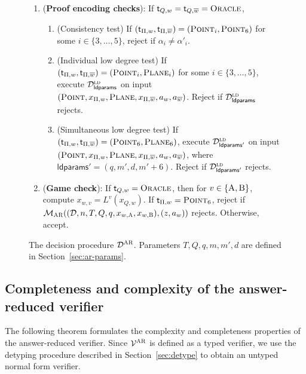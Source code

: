 \documentclass[11pt]{article}
\theoremstyle{definition}
\newcommand{\ol}[1]{\overline{#1}}
\newcommand{\ld}{\textsc{ld}}
\newcommand{\decider}{\mathcal{D}}
\newcommand{\verifier}{\mathcal{V}}
\newcommand{\gamestyle}[1]{\ensuremath{\textsc{#1}}\xspace}
\newcommand{\ar}{\gamestyle{AR}}
\newcommand{\labelstyle}[1]{\ensuremath{\textsc{#1}}\xspace}
\newcommand{\tvarstyle}[1]{\mathsf{#1}}
\newcommand{\tvar}{\ensuremath{\tvarstyle{t}}}
\newcommand{\alice}{\labelstyle{A}}
\newcommand{\bob}{\labelstyle{B}}
\newcommand{\oracle}{\labelstyle{Oracle}}
\newcommand{\typestyle}[1]{\ensuremath{\textsc{#1}}\xspace}
\newcommand{\Plane}{\typestyle{Plane}}
\newcommand{\Point}{\typestyle{Point}}
\newcommand{\ldparams}{\mathsf{ldparams}}
\newenvironment{gamespec}{
  \begin{mdframed}[style=figstyle]}{
  \end{mdframed}}
\newcommand{\pcpverifier}{\mathcal{M}_\ar}
\newcommand{\qlen}{Q}
\begin{document}
\begin{figure}[!htb]
\begin{gamespec}
\begin{enumerate}
    \item (\textbf{Proof encoding checks}): If $\tvar_{Q,w} = \tvar_{Q,\ol{w}} =
      \oracle$,
      \begin{enumerate}
			\item (Consistency test) If $(\tvar_{\Pi,w}, \tvar_{\Pi, \ol{w}}) =
        (\Point_i, \Point_6)$ for some $i \in \{3, \dots, 5\}$, reject if
        $\alpha_i \neq \alpha'_i$.
        \label{enu:ar-proof-cons-ld}

      \item (Individual low degree test) If $(\tvar_{\Pi,w}, \tvar_{\Pi,
          \ol{w}}) = (\Point_i, \Plane_i)$ for some $i \in \{3, \dots, 5\}$,
        execute $\decider^\ld_{\ldparams}$ on input $(\Point, x_{\Pi,w}
        ,\Plane,x_{\Pi,\overline{w}}, a_w,a_{\ol{w}})$.
        Reject if $\decider^\ld_{\ldparams}$ rejects.
        \label{enu:ar-proof-id-ld}

      \item (Simultaneous low degree test) If $(\tvar_{\Pi, w}, \tvar_{\Pi,
          \ol{w}}) = (\Point_6,\Plane_6)$, execute $\decider^\ld_{\ldparams'}$
        on input $(\Point, x_{\Pi,w} ,\Plane,x_{\Pi,\overline{w}},
        a_w,a_{\ol{w}})$, where $\ldparams'=(q,m',d,m'+6)$.
        Reject if $\decider^\ld_{\ldparams'}$ rejects.
        \label{enu:ar-proof-sim-ld}
      \end{enumerate}
      \label{enu:ar-proof-encoding}

    \item (\textbf{Game check}): If $\tvar_{Q,w} = \oracle$, then for $v \in
      \{\alice,\bob\}$, compute $x_{w,v} = L^{v}(x_{Q,w})$.
      If $\tvar_{\Pi,w} = \Point_6$, reject if $\pcpverifier((\decider, n , T,
      \qlen, q, x_{w,\alice}, x_{w,\bob}), (z, a_{w} ))$ rejects.
      Otherwise, accept. 
      \label{enu:ar-game}
    \end{enumerate}
  \end{gamespec}
  \caption{The decision procedure $\decider^\ar$.
    Parameters $T,Q,q,m,m',d$ are defined in
    Section~\ref{sec:ar-params}.}
  \label{fig:decider-pcp}
\end{figure}

\subsection{Completeness and complexity of the answer-reduced verifier}
\label{sec:ar-completeness}

The following theorem formulates the complexity and completeness properties of
the answer-reduced verifier.
Since $\verifier^\ar$ is defined as a typed verifier, we use the detyping
procedure described in Section~\ref{sec:detype} to obtain an untyped
normal form verifier.
\end{document}
